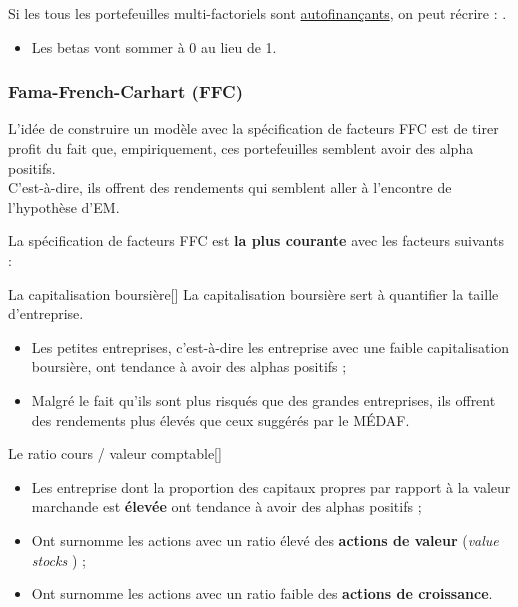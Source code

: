 \documentclass[10pt, french]{article}
\begin{document}
\begin{multicols*}{2}
\begin{definitionNOHFILLprop}
Si les tous les portefeuilles multi-factoriels sont \hyperlink{autofin-ptf}{\color{trueblue}autofinançants}, on peut récrire : .
\begin{itemize}
	\item	Les betas vont sommer à 0 au lieu de 1.
\end{itemize}
\end{definitionNOHFILLprop}


\columnbreak
\subsubsection{Fama-French-Carhart (FFC)}
\begin{rappel_enhanced}[Contexte]
L'idée de construire un modèle avec la spécification de facteurs FFC est de tirer profit du fait que, empiriquement, ces portefeuilles semblent avoir des alpha positifs.\\
C'est-à-dire, ils offrent des rendements qui semblent aller à l'encontre de l'hypothèse d'EM.
\end{rappel_enhanced}

La spécification de facteurs FFC est \textbf{la plus courante} avec les facteurs suivants :

\begin{definitionGENERAL}{La capitalisation boursière}[]
La capitalisation boursière sert à quantifier la taille d'entreprise.	\\

\begin{itemize}
	\item	Les petites entreprises, c'est-à-dire les entreprise avec une faible capitalisation boursière, ont tendance à avoir des alphas positifs ;
	\item	Malgré le fait qu'ils sont plus risqués que des grandes entreprises, ils offrent des rendements plus élevés que ceux suggérés par le MÉDAF.
\end{itemize}
\end{definitionGENERAL}

\begin{definitionGENERAL}{Le ratio cours / valeur comptable}[]
\begin{itemize}
	\item	Les entreprise dont la proportion des capitaux propres par rapport à la valeur marchande est \textbf{élevée} ont tendance à avoir des alphas positifs ;
	\item	Ont surnomme les actions avec un ratio élevé des \textbf{actions de valeur} (\og \textit{value stocks} \fg{}) ;
	\item	Ont surnomme les actions avec un ratio faible des \textbf{actions de croissance}.
\end{itemize}
\end{definitionGENERAL}


\end{multicols*}
\end{document}
